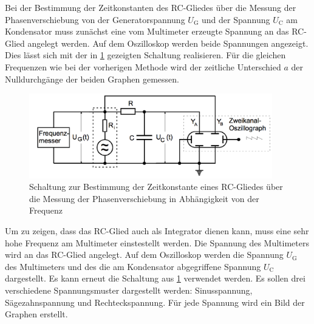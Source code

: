 Bei der Bestimmung der Zeitkonstanten des RC-Gliedes über die Messung der Phasenverschiebung
von der Generatorspannung $U_{\text{G}}$ und der Spannung $U_{\text{C}}$ am Kondensator
muss zunächst eine vom Multimeter erzeugte Spannung an das RC-Glied angelegt werden.
Auf dem Oszilloskop werden beide Spannungen angezeigt. Dies lässt sich mit der in \ref{fig:Schaltung_4c}
gezeigten Schaltung realisieren. Für die gleichen Frequenzen wie bei der vorherigen
Methode wird der zeitliche Unterschied $a$ der Nulldurchgänge der beiden Graphen gemessen.

\begin{figure}
  \centering
  \includegraphics[width=300pt]{4c_schaltung.png}
  \caption{Schaltung zur Bestimmung der Zeitkonstante eines RC-Gliedes über die Messung
  der Phasenverschiebung in Abhängigkeit von der Frequenz \cite{Versuchsanleitung}}
  \label{fig:Schaltung_4c}
\end{figure}

Um zu zeigen, dass das RC-Glied auch als Integrator dienen kann, muss eine sehr hohe
Frequenz am Multimeter einstestellt werden. Die Spannung des Multimeters wird an das
RC-Glied angelegt. Auf dem Oszilloskop werden die Spannung $U_{\text{G}}$ des Multimeters und des
die am Kondensator abgegriffene Spannung $U_{\text{C}}$ dargestellt. Es kann erneut die Schaltung
aus \ref{fig:Schaltung_4c} verwendet werden. Es sollen drei verschiedene
Spannungsmuster dargestellt werden: Sinusspannung, Sägezahnspannung und Rechteckspannung.
Für jede Spannung wird ein Bild der Graphen erstellt.
